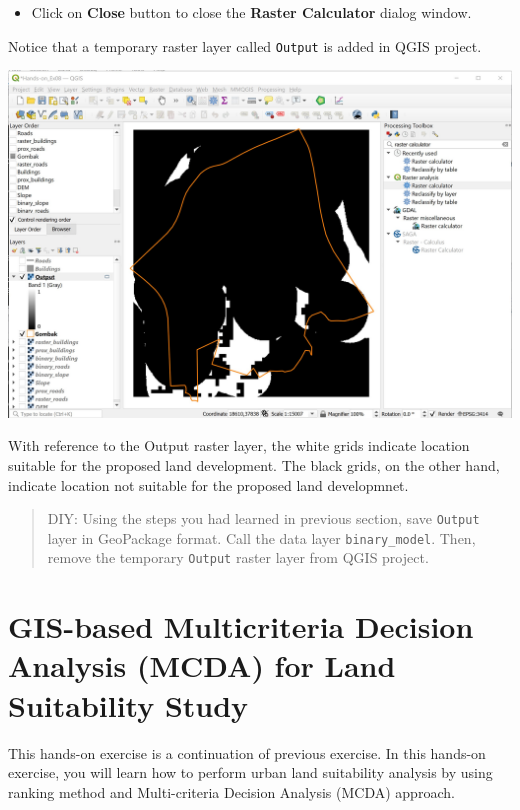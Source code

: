 \documentclass[
  letterpaper,
  DIV=11,
  numbers=noendperiod]{scrreprt}
\providecommand{\tightlist}{%
  \setlength{\itemsep}{0pt}\setlength{\parskip}{0pt}}\usepackage{longtable,booktabs,array}
\begin{document}
\begin{itemize}
\tightlist
\item
  Click on \textbf{Close} button to close the \textbf{Raster Calculator}
  dialog window.
\end{itemize}

Notice that a temporary raster layer called \texttt{Output} is added in
QGIS project.

\includegraphics{./img07/image46.jpg}

With reference to the Output raster layer, the white grids indicate
location suitable for the proposed land development. The black grids, on
the other hand, indicate location not suitable for the proposed land
developmnet.

\begin{quote}
DIY: Using the steps you had learned in previous section, save
\texttt{Output} layer in GeoPackage format. Call the data layer
\texttt{binary\_model}. Then, remove the temporary \texttt{Output}
raster layer from QGIS project.
\end{quote}


\hypertarget{gis-based-multicriteria-decision-analysis-mcda-for-land-suitability-study}{%
\chapter{GIS-based Multicriteria Decision Analysis (MCDA) for Land
Suitability
Study}\label{gis-based-multicriteria-decision-analysis-mcda-for-land-suitability-study}}

This hands-on exercise is a continuation of previous exercise. In this
hands-on exercise, you will learn how to perform urban land suitability
analysis by using ranking method and Multi-criteria Decision Analysis
(MCDA) approach.
\end{document}
